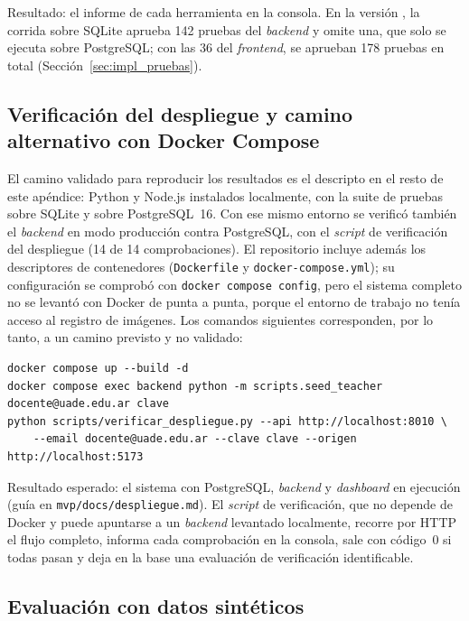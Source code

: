 \noindent Resultado: el informe de cada herramienta en la consola. En la versión \texttt{\commitpruebas}, la corrida sobre SQLite aprueba 142 pruebas del \textit{backend} y omite una, que solo se ejecuta sobre PostgreSQL; con las 36 del \textit{frontend}, se aprueban 178 pruebas en total (Sección~\ref{sec:impl_pruebas}).

\subsection{Verificación del despliegue y camino alternativo con Docker Compose}
\label{sec:repro_docker}

El camino validado para reproducir los resultados es el descripto en el resto de este apéndice: Python y Node.js instalados localmente, con la suite de pruebas sobre SQLite y sobre PostgreSQL~16. Con ese mismo entorno se verificó también el \textit{backend} en modo producción contra PostgreSQL, con el \textit{script} de verificación del despliegue (14 de 14 comprobaciones). El repositorio incluye además los descriptores de contenedores (\texttt{Dockerfile} y \texttt{docker-compose.yml}); su configuración se comprobó con \texttt{docker compose config}, pero el sistema completo no se levantó con Docker de punta a punta, porque el entorno de trabajo no tenía acceso al registro de imágenes. Los comandos siguientes corresponden, por lo tanto, a un camino previsto y no validado:

\begin{footnotesize}
\begin{verbatim}
docker compose up --build -d
docker compose exec backend python -m scripts.seed_teacher docente@uade.edu.ar clave
python scripts/verificar_despliegue.py --api http://localhost:8010 \
    --email docente@uade.edu.ar --clave clave --origen http://localhost:5173
\end{verbatim}
\end{footnotesize}

\noindent Resultado esperado: el sistema con PostgreSQL, \textit{backend} y \textit{dashboard} en ejecución (guía en \texttt{mvp/docs/despliegue.md}). El \textit{script} de verificación, que no depende de Docker y puede apuntarse a un \textit{backend} levantado localmente, recorre por HTTP el flujo completo, informa cada comprobación en la consola, sale con código~0 si todas pasan y deja en la base una evaluación de verificación identificable.

\subsection{Evaluación con datos sintéticos}

